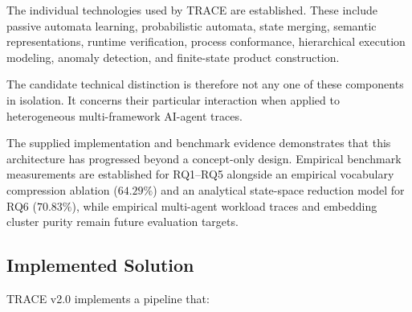 \documentclass[11pt,a4paper]{article}
\begin{document}
The individual technologies used by TRACE are established. These include passive automata
learning, probabilistic automata, state merging, semantic representations, runtime
verification, process conformance, hierarchical execution modeling, anomaly detection,
and finite-state product construction.

The candidate technical distinction is therefore not any one of these components in
isolation. It concerns their particular interaction when applied to heterogeneous
multi-framework AI-agent traces.

The supplied implementation and benchmark evidence demonstrates that this architecture
has progressed beyond a concept-only design. Empirical benchmark measurements are established
for RQ1--RQ5 alongside an empirical vocabulary compression ablation ($64.29\%$) and an
analytical state-space reduction model for RQ6 ($70.83\%$), while empirical multi-agent
workload traces and embedding cluster purity remain future evaluation targets.

\subsection{Implemented Solution}

TRACE v2.0 implements a pipeline that:
\end{document}

